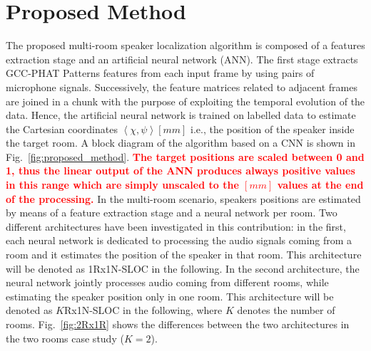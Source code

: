 \documentclass[review]{elsarticle}
\newcommand{\figref}[1]{Fig.~\ref{#1}}
\begin{document}
\section{Proposed Method}\label{sec:ALGO}
The proposed multi-room speaker localization algorithm is composed of a features extraction stage and an artificial neural network (ANN). The first stage extracts GCC-PHAT Patterns features from each input frame by using pairs of microphone signals. Successively, the feature matrices related to adjacent frames are joined in a chunk  with the purpose of exploiting the temporal evolution of the data. Hence, the artificial neural network is trained on labelled data to estimate the Cartesian coordinates $\left \langle \chi,\psi \right \rangle \left [mm\right ]$ i.e., the position of the speaker inside the target room.
A block diagram of the algorithm based on a CNN is shown in \figref{fig:proposed_method}.  %
\textcolor{red}{\textbf{The target positions are scaled between 0 and 1, thus the linear output of the ANN produces always positive values in this range which are simply unscaled to the $\left [mm\right ]$ values at the end of the processing.}}
In the multi-room scenario, speakers positions are estimated by means of a feature extraction stage and a neural network per room. Two different architectures have been investigated in this contribution: in the first, each neural network is dedicated to processing the audio signals coming from a room and it estimates the position of the speaker in that room. This architecture will be denoted as 1Rx1N-SLOC in the following. In the second architecture, the neural network jointly processes audio coming from different rooms, while estimating the speaker position only in one room. This architecture will be denoted as $K$Rx1N-SLOC in the following, where $K$ denotes the number of rooms. \figref{fig:2Rx1R} shows the differences between the two architectures in the two rooms case study ($K=2$). %
\end{document}
